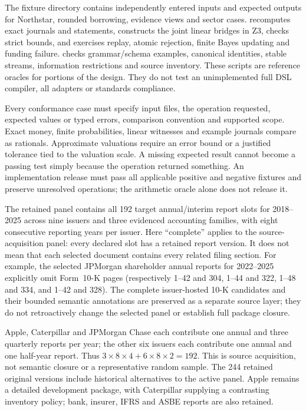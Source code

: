 The fixture directory contains independently entered inputs and expected
outputs for Northstar, rounded borrowing, evidence views and sector cases.
 recomputes exact journals and statements,
constructs the joint linear bridges in Z3, checks strict bounds, and exercises
replay, atomic rejection, finite Bayes updating and funding failure.
 checks grammar/schema examples, canonical
identities, stable streams, information restrictions and source inventory.
These scripts are reference oracles for portions of the design. They do not
test an unimplemented full DSL compiler, all adapters or standards compliance.

Every conformance case must specify input files, the operation requested,
expected values or typed errors, comparison convention and supported scope.
Exact money, finite probabilities, linear witnesses and example journals
compare as rationals. Approximate valuations require an error bound or a
justified tolerance tied to the valuation scale. A missing expected result
cannot become a passing test simply because the operation returned something.
An implementation release must pass all applicable positive and negative
fixtures and preserve unresolved operations; the arithmetic oracle alone
does not release it.

The retained panel contains all 192 target annual/interim report slots for
2018--2025 across nine issuers and three evidenced accounting families, with
eight consecutive reporting years per issuer. Here ``complete'' applies to the
source-acquisition panel: every declared slot has a retained report version.
It does not mean that each selected document contains every related filing
section. For example, the selected JPMorgan shareholder annual reports for
2022--2025 explicitly omit Form~10-K pages (respectively 1--42 and 304,
1--44 and 322, 1--48 and 334, and 1--42 and 328). The complete issuer-hosted
10-K candidates and their bounded semantic annotations are preserved as a
separate source layer; they do not retroactively change the selected panel or
establish full package closure.

Apple, Caterpillar and JPMorgan
Chase each contribute one annual and three quarterly reports per year; the
other six issuers each contribute one annual and one half-year report. Thus
$3\times8\times4+6\times8\times2=192$. This is source acquisition, not
semantic closure or a representative random sample. The 244 retained original
versions include historical alternatives to the active panel. Apple remains
a detailed development package, with Caterpillar supplying a contrasting
inventory policy; bank, insurer, IFRS and ASBE reports are also retained.

